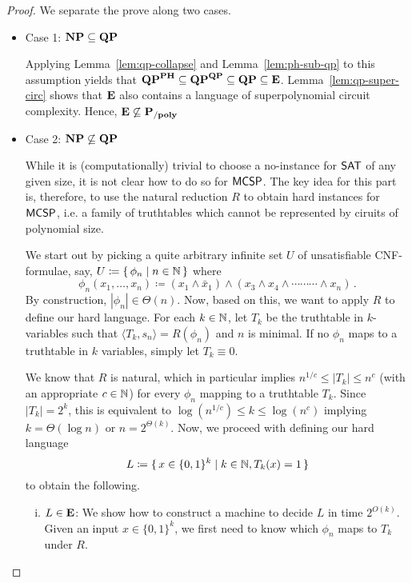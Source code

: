 \documentclass[11pt]{article}
\begin{document}
\begin{proof}
  We separate the prove along two cases.
	\begin{itemize}
		\item Case 1: $\mathbf{NP} \subseteq \mathbf{QP}$

      Applying Lemma~\ref{lem:qp-collapse} and Lemma~\ref{lem:ph-sub-qp} to this assumption yields that
      $\mathbf{QP}^{\mathbf{PH}} \subseteq \mathbf{QP}^{\mathbf{QP}} \subseteq
       \mathbf{QP} \subseteq \mathbf{E}$.
      Lemma~\ref{lem:qp-super-circ} shows that $\mathbf{E}$ also contains
      a language of superpolynomial circuit complexity.
      Hence, $\mathbf{E} \not\subseteq \mathbf{P_{/poly}}$\\
		
		\item Case 2: $\mathbf{NP} \not\subseteq \mathbf{QP}$

      While it is (computationally) trivial to choose a no-instance for $\mathsf{SAT}$
      of any given size, it is not clear how to do so for $\mathsf{MCSP}$.
      The key idea for this part is, therefore, to use the natural reduction $R$
      to obtain hard instances for $\mathsf{MCSP}$, i.e. a family of
      truthtables which cannot be represented by ciruits of polynomial size.

      We start out by picking a quite arbitrary infinite set $U$ of 
      unsatisfiable CNF-formulae, say,
      $U \coloneqq \{\, { \phi_n \mid n \in {\mathbb{N}} } \,\}$
      where
      \[
        \phi_n(x_1, \dots, x_n) \coloneqq
        (x_1 \land \bar x_1) \land
        (x_3 \land x_4 \land \cdots \cdots \cdots \land x_n) \,.
      \]
      By construction, $|\phi_n| \in \Theta(n)$.
      Now, based on this, we want to apply $R$ to define our hard language.
      For each $k \in {\mathbb{N}}$, let $T_k$ be the truthtable in $k$-variables such
      that $\langle T_k, s_n \rangle = R(\phi_n)$ and $n$ is minimal.
      If no $\phi_n$ maps to a truthtable in $k$ variables, simply let
      $T_k \equiv 0$.

      We know that $R$ is natural, which in particular implies
      $n^{1/c} \le |T_k| \le n^c$ (with an appropriate $c \in {\mathbb{N}}$)
      for every $\phi_n$ mapping to a truthtable $T_k$.
      Since $|T_k| = 2^k$, this is equivalent to
      $\log (n^{1/c}) \le k \le \log (n^c)$
      implying $k = \Theta(\log n)$ or $n = 2^{\Theta(k)}$.
      Now, we proceed with defining our hard language
      \[
        L \coloneqq
        \{\, {
          x \in \{0,1\}^k \mid
          k \in {\mathbb{N}},
          T_k(x) = 1
        } \,\}
      \]
      to obtain the following.
      \begin{enumerate}[(i)]
        \item $L \in \mathbf{E}$:
          We show how to construct a machine to decide $L$ in time
          $2^{O(k)}$.
          Given an input $x \in \{0,1\}^k$, we first need to know which
          $\phi_n$ maps to $T_k$ under $R$.


\end{enumerate}
\end{itemize}
\end{proof}
\end{document}
